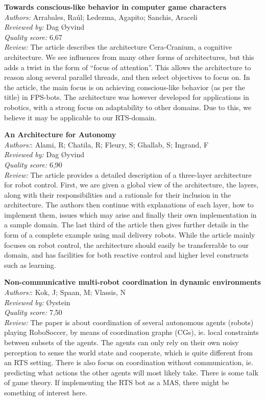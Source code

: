\textbf{Towards conscious-like behavior in computer game characters}\\
\textit{Authors:} Arrabales, Raúl; Ledezma, Agapito; Sanchis, Araceli\\
\textit{Reviewed by:} Dag Øyvind\\
\textit{Quality score:} 6,67\\
\textit{Review:} The article describes the architecture Cera-Cranium, a cognitive architecture.  We see influences from many other forms of architectures, but this adds a twist in the form of “focus of attention”.  This allows the architecture to reason along several parallel threads, and then select objectives to focus on.  In the article, the main focus is on achieving conscious-like behavior (as per the title) in FPS-bots.  The architecture was however developed for applications in robotics, with a strong focus on adaptability to other domains.  Due to this, we believe it may be applicable to our RTS-domain.


\textbf{An Architecture for Autonomy}\\
\textit{Authors:}: Alami, R; Chatila, R; Fleury, S; Ghallab, S; Ingrand, F\\
\textit{Reviewed by:} Dag Øyvind\\
\textit{Quality score:} 6,90\\
\textit{Review:} The article provides a detailed description of a three-layer architecture for robot control.  First, we are given a global view of the architecture, the layers, along with their responsibilities and a rationale for their inclusion in the architecture.  The authors then continue with explanations of each layer, how to implement them, issues which may arise and finally their own implementation in a sample domain.  The last third of the article then gives further details in the form of a complete example using mail delivery robots.  While the article mainly focuses on robot control, the architecture should easily be transferrable to our domain, and has facilities for both reactive control and higher level constructs such as learning.

\textbf{Non-communicative multi-robot coordination in dynamic environments}\\
\textit{Authors:}: Kok, J; Spaan, M; Vlassis, N\\
\textit{Reviewed by:} Øystein\\
\textit{Quality score:} 7,50\\
\textit{Review:} The paper is about coordination of several autonomous agents (robots) playing RoboSoccer, by means of coordination graphs (CGs), ie. local constraints between subsets of the agents. The agents can only rely on their own noisy perception to sense the world state and cooperate, which is quite different from an RTS setting. There is also focus on coordination without communication, ie. predicting what actions the other agents will most likely take. There is some talk of game theory.  If implementing the RTS bot as a MAS, there might be something of interest here.

